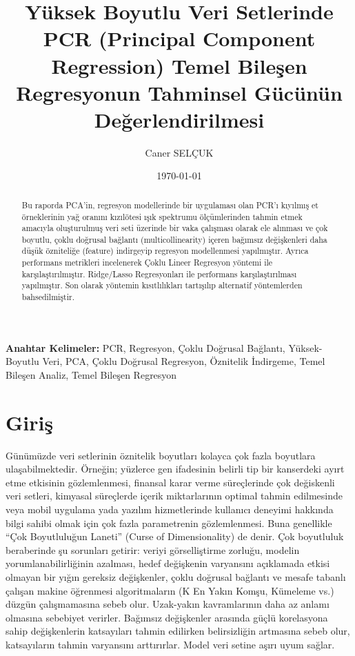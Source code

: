 \documentclass[12pt]{article}
\title{Yüksek Boyutlu Veri Setlerinde PCR (Principal Component Regression) Temel Bileşen Regresyonun Tahminsel Gücünün Değerlendirilmesi}
\author{Caner SELÇUK}
\date{\today}
\begin{document}
\shorthandoff{=}

\maketitle
\tableofcontents

\begin{abstract}
Bu raporda PCA'in, regresyon modellerinde bir uygulaması olan PCR'ı kıyılmış et örneklerinin yağ oranını kızılötesi ışık spektrumu ölçümlerinden tahmin etmek amacıyla oluşturulmuş \cite{dataset} veri seti üzerinde bir vaka çalışması olarak ele alınması ve çok boyutlu, çoklu doğrusal bağlantı (multicollinearity) içeren bağımsız değişkenleri daha düşük özniteliğe (feature) indirgeyip regresyon modellenmesi yapılmıştır. Ayrıca performans metrikleri incelenerek Çoklu Lineer Regresyon yöntemi ile karşılaştırılmıştır. Ridge/Lasso Regresyonları ile performans karşılaştırılması yapılmıştır. Son olarak yöntemin kısıtlılıkları tartışılıp alternatif yöntemlerden bahsedilmiştir.
\end{abstract}

\noindent\textbf{Anahtar Kelimeler:} PCR, Regresyon, Çoklu Doğrusal Bağlantı, Yüksek-Boyutlu Veri, PCA, Çoklu Doğrusal Regresyon, Öznitelik İndirgeme, Temel Bileşen Analiz, Temel Bileşen Regresyon

\newpage

\section{Giriş}
Günümüzde veri setlerinin öznitelik boyutları kolayca çok fazla boyutlara
ulaşabilmektedir. Örneğin; yüzlerce gen ifadesinin belirli tip bir kanserdeki ayırt etme etkisinin gözlemlenmesi, finansal karar verme süreçlerinde çok değiskenli veri setleri, kimyasal süreçlerde içerik miktarlarının optimal tahmin edilmesinde veya mobil uygulama yada yazılım hizmetlerinde kullanıcı deneyimi hakkında bilgi sahibi olmak için çok fazla parametrenin gözlemlenmesi. Buna genellikle ``Çok Boyutluluğun Laneti'' (Curse of Dimensionality) de denir. Çok boyutluluk beraberinde şu sorunları getirir:
veriyi görselliştirme zorluğu, modelin yorumlanabilirliğinin azalması, hedef değişkenin varyansını açıklamada etkisi olmayan bir yığın gereksiz değişkenler, çoklu doğrusal bağlantı ve mesafe tabanlı çalışan makine öğrenmesi algoritmaların (K En Yakın Komşu, Kümeleme vs.) düzgün çalışmamasına sebeb olur. Uzak-yakın kavramlarının daha az anlamı
olmasına sebebiyet verirler. Bağımsız değişkenler arasında güçlü korelasyona sahip değişkenlerin katsayıları tahmin edilirken belirsizliğin artmasına sebeb olur, katsayıların tahmin varyansını arttırırlar. Model veri setine aşırı uyum sağlar.
\end{document}
